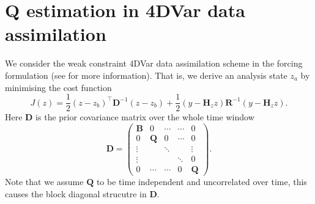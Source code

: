 \documentclass[a4paper,10pt]{article}
\numberwithin{equation}{section}
\begin{document}
\section{$\mathbf Q$ estimation in 4DVar data assimilation}
\label{sec:method}
We consider the weak constraint 4DVar data assimilation scheme in the forcing formulation (see \cite{book} for more information). That is, we derive an analysis state $z_a$ by minimising the cost function
\begin{equation}
\label{eqn:cost}
J(z)=\frac{1}{2}(z-z_b)^\top \mathbf D^{-1}(z-z_b)+\frac{1}{2}(y-\mathbf H_z z)\mathbf R^{-1}(y-\mathbf H_z z).
\end{equation}
Here  $\mathbf D$ is the prior covariance matrix over the whole time window
\begin{equation}
\mathbf D = 
\begin{pmatrix}
\mathbf B & 0 & \cdots  &\cdots & 0 \\
0 & \mathbf Q & 0 & \cdots & 0\\
\vdots & & \ddots && \vdots\\
\vdots & && \ddots & 0\\
0 & \cdots & \cdots & 0 & \mathbf Q
\end{pmatrix}.
\end{equation}
Note that we assume $\mathbf Q$ to be time independent and uncorrelated over time, this causes the block diagonal strucutre in $\mathbf D$. 
\end{document}
